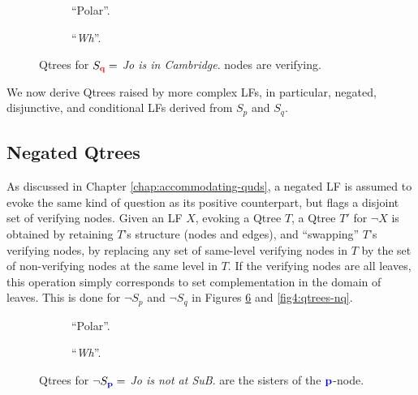 	\begin{figure}[H]
		\centering
		\begin{subfigure}[b]{.45\linewidth}
			\centering
			\caption[]{``Polar''.}\label{fig4:qtree-q-polar}
		\end{subfigure}\hfill
		\begin{subfigure}[b]{.45\linewidth}
			\centering
			\caption[]{``\textit{Wh}''.}\label{fig4:qtree-q-wh}
		\end{subfigure}
		\caption[]{Qtrees for $S\protect_{\textbf{\textcolor{red}{q}}}=$ \textit{Jo is in Cambridge}.  nodes are verifying.}
		\label{fig4:qtrees-q}
	\end{figure}


We now derive Qtrees raised by more complex LFs, in particular, negated, disjunctive, and conditional LFs derived from $S_p$ and $S_q$.

\subsection{Negated Qtrees}
As discussed in Chapter \ref{chap:accommodating-quds}, a negated LF is assumed to evoke the same kind of question as its positive counterpart, but flags a disjoint set of verifying nodes. Given an LF $X$, evoking a Qtree $T$, a Qtree $T'$ for $\neg X$ is obtained by retaining $T$'s structure (nodes and edges), and ``swapping'' $T$'s verifying nodes, by replacing any set of same-level verifying nodes in $T$ by the set of non-verifying nodes at the same level in $T$. If the verifying nodes are all leaves, this operation simply corresponds to set complementation in the domain of leaves. This is done for $\neg S_p$ and $\neg S_q$ in Figures \ref{fig4:qtrees-np} and \ref{fig4:qtrees-nq}.

	\setlength{\fboxsep}{2pt}
	\begin{figure}[H]
		\centering
		\begin{subfigure}[b]{.45\linewidth}
			\centering
			\caption[]{``Polar''.}\label{fig4:qtree-np-polar}
		\end{subfigure}\hfill
		\begin{subfigure}[b]{.45\linewidth}
			\centering
			\scalebox{1}{
				\begin{forest}
					[CS [{$\p$}][\fbox{$\q$}][\fbox{$\r$}][\fbox{...}]]
				\end{forest}
			}
			\caption[]{``\textit{Wh}''.}\label{fig4:qtree-np-wh}
		\end{subfigure}
		\caption[]{Qtrees for $\neg S\protect_{\textbf{\textcolor{blue}{p}}}=$ \textit{Jo is not at SuB}.  are the sisters of the $\p$-node.}
		\label{fig4:qtrees-np}
	\end{figure}
	
